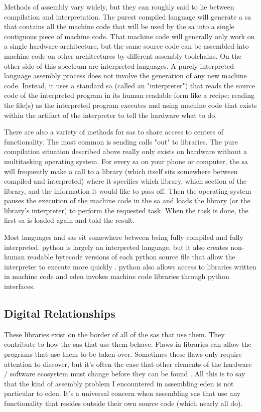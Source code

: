 \documentclass[a4paper,man,natbib]{apa6}
\begin{document}
   Methods of assembly vary widely, but they can roughly said to lie between compilation and interpretation. The purest compiled language will generate a \gls{sa} that contains all the machine code that will be used by the \gls{sa} into a single contiguous piece of machine code. That machine code will generally only work on a single hardware architecture, but the same source code can be assembled into machine code on other architectures by different assembly toolchains. On the other side of this spectrum are interpreted languages. A purely interpreted language assembly process does not involve the generation of any new machine code. Instead, it uses a standard \gls{sa} (called an "interpreter") that reads the source code of the interpreted program in its human readable form like a recipe: reading the file(s) as the interpreted program executes and using machine code that exists within the artifact of the interpreter to tell the hardware what to do.

   There are also a variety of methods for \glspl{sa} to share access to centers of functionality. The most common is sending calls "out" to libraries. The pure compilation situation described above really only exists on hardware without a multitasking operating system. For every \gls{sa} on your phone or computer, the \gls{sa} will frequently make a call to a library (which itself sits somewhere between compiled and interpreted) where it specifies which library, which section of the library, and the information it would like to pass off. Then the operating system pauses the execution of the machine code in the \gls{sa} and loads the library (or the library's interpreter) to perform the requested task. When the task is done, the first \gls{sa} is loaded again and told the result. 

   Most languages and \glspl{sa} sit somewhere between being fully compiled and fully interpreted. \Gls{python} is largely an interpreted language, but it also creates non-human readable bytecode versions of each python source file that allow the interpreter to execute more quickly \citep{The_Python_Software_Foundation2020-qz}. \Gls{python} also allows access to libraries written in machine code and \acrshort{eden} invokes machine code libraries through \gls{python} interfaces.

   \subsection*{Digital Relationships}
   These libraries exist on the border of all of the \glspl{sa} that use them. They contribute to how the \glspl{sa} that use them behave. Flaws in libraries can allow the programs that use them to be taken over. Sometimes these flaws only require attention to discover, but it's often the case that other elements of the hardware / software ecosystem must change before they can be found \citep{Huang2003-ki}. All this is to say that the kind of assembly problem I encountered in assembling \acrshort{eden} is not particular to \acrshort{eden}. It's a universal concern when assembling \glspl{sa} that use any functionality that resides outside their own source code (which nearly all do).
\end{document}
